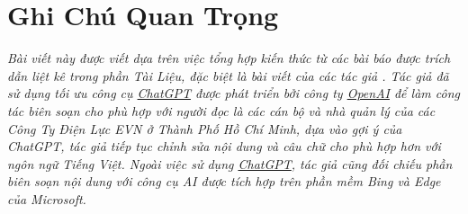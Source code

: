 \documentclass[utf8]{frontiersSCNS} %
\begin{document}
%
%







\section*{Ghi Chú Quan Trọng}
\textit{Bài viết này được viết dựa trên việc tổng hợp kiến thức từ các bài báo được trích dẫn liệt kê trong phần Tài Liệu, đặc biệt là bài viết của các tác giả \cite{Kezunovic2020,Angadi2020}. Tác giả đã sử dụng tối ưu công cụ \href{https://chat.openai.com/chat}{ChatGPT} được phát triển bởi công ty \href{www.openai.com}{OpenAI} để làm công tác biên soạn cho phù hợp với người đọc là các cán bộ và nhà quản lý của các Công Ty Điện Lực EVN ở Thành Phố Hồ Chí Minh, dựa vào gợi ý của ChatGPT, tác giả tiếp tục chỉnh sửa nội dung và câu chữ cho phù hợp hơn với ngôn ngữ Tiếng Việt. Ngoài việc sử dụng  \href{https://chat.openai.com/chat}{ChatGPT}, tác giả cũng đối chiếu phần biên soạn nội dung với công cụ AI được tích hợp trên phần mềm Bing và Edge của Microsoft.} 
\end{document}
